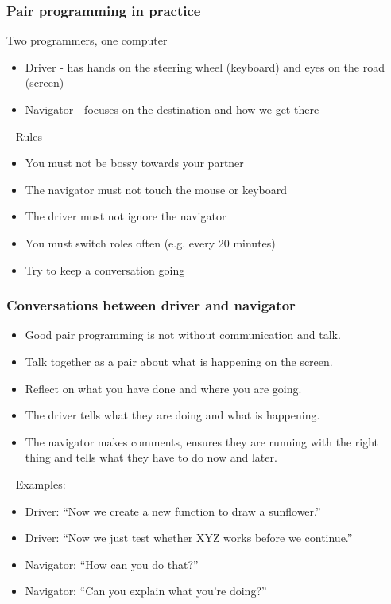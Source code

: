 \documentclass[10pt]{beamer}
\begin{document}

\begin{frame}
   \frametitle{Pair programming in practice}

  Two programmers, one computer
     \begin{itemize}
     \item Driver - has hands on the steering wheel (keyboard)
       and eyes on the road (screen)
     \item Navigator - focuses on the destination and
       how we get there
     \end{itemize}
~
Rules
\begin{itemize}
   \item You must not be bossy towards your partner
   \item The navigator must not touch the mouse or keyboard
   \item The driver must not ignore the navigator
   \item You must switch roles often (e.g. every 20 minutes)
   \item Try to keep a conversation going
   \end{itemize}
\end{frame}
 

\begin{frame}
   \frametitle{Conversations between driver and navigator}
     \begin{itemize}
   \item Good pair programming is not without communication and talk.
   \item Talk together as a pair about what is happening
     on the screen.
   \item Reflect on what you have done and where you are going.
   \item The driver tells what they are doing and what is happening.
   \item The navigator makes comments, ensures they are running
     with the right thing and tells what they have to do now and later.
   \end{itemize}
   ~
   Examples:
   \begin{itemize}
   \item Driver: ``Now we create a new function to draw a sunflower.''
   \item Driver: ``Now we just test whether XYZ works before we continue.''
   \item Navigator: ``How can you do that?''
   \item Navigator: ``Can you explain what you're doing?''
   \end{itemize}
\end{frame}
\end{document}
